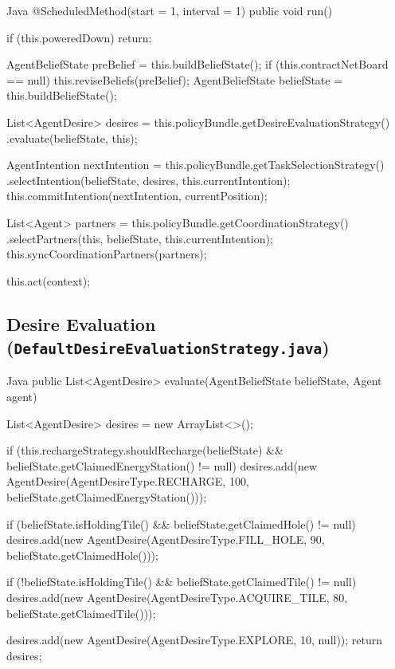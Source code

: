 \begin{sustechcode}{Java}
@ScheduledMethod(start = 1, interval = 1)
public void run() {
    if (this.poweredDown) { return; }

    AgentBeliefState preBelief = this.buildBeliefState();
    if (this.contractNetBoard == null) {
        this.reviseBeliefs(preBelief);
    }
    AgentBeliefState beliefState = this.buildBeliefState();

    List<AgentDesire> desires = this.policyBundle.getDesireEvaluationStrategy()
            .evaluate(beliefState, this);

    AgentIntention nextIntention = this.policyBundle.getTaskSelectionStrategy()
            .selectIntention(beliefState, desires, this.currentIntention);
    this.commitIntention(nextIntention, currentPosition);

    List<Agent> partners = this.policyBundle.getCoordinationStrategy()
            .selectPartners(this, beliefState, this.currentIntention);
    this.syncCoordinationPartners(partners);

    this.act(context);
}
\end{sustechcode}

\subsection{Desire Evaluation (\texttt{DefaultDesireEvaluationStrategy.java})}

\begin{sustechcode}{Java}
public List<AgentDesire> evaluate(AgentBeliefState beliefState, Agent agent) {
    List<AgentDesire> desires = new ArrayList<>();

    if (this.rechargeStrategy.shouldRecharge(beliefState)
            && beliefState.getClaimedEnergyStation() != null) {
        desires.add(new AgentDesire(AgentDesireType.RECHARGE, 100,
                beliefState.getClaimedEnergyStation()));
    }

    if (beliefState.isHoldingTile() && beliefState.getClaimedHole() != null) {
        desires.add(new AgentDesire(AgentDesireType.FILL_HOLE, 90,
                beliefState.getClaimedHole()));
    }

    if (!beliefState.isHoldingTile() && beliefState.getClaimedTile() != null) {
        desires.add(new AgentDesire(AgentDesireType.ACQUIRE_TILE, 80,
                beliefState.getClaimedTile()));
    }

    desires.add(new AgentDesire(AgentDesireType.EXPLORE, 10, null));
    return desires;
}
\end{sustechcode}

